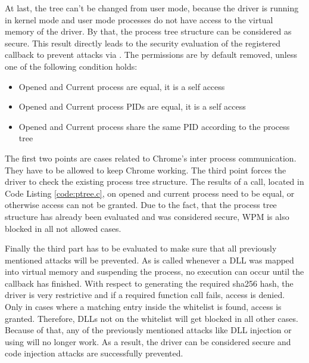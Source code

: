 At last, the tree can't be changed from user mode, because the driver is running in kernel mode and user mode processes do not have access to the virtual memory of the driver. By that, the process tree structure can be considered as secure. This result directly leads to the security evaluation of the registered callback to prevent attacks via . The permissions are by default removed, unless one of the following condition holds:
\begin{itemize}
\item Opened and Current process are equal, it is a self access
\item Opened and Current process \glspl{PID} are equal, it is a self access
\item Opened and Current process share the same \gls{PID} according to the process tree
\end{itemize}
The first two points are cases related to Chrome's inter process communication. They have to be allowed to keep Chrome working. The third point forces the driver to check the existing process tree structure. The results of a  call, located in Code Listing \ref{code:ptree.c}, on opened and current process need to be equal, or otherwise access can not be granted. Due to the fact, that the process tree structure has already been evaluated and was considered secure, \gls{WPM} is also blocked in all not allowed cases. 

Finally the third part has to be evaluated to make sure that all previously mentioned attacks will be prevented. As  is called whenever a \gls{DLL} was mapped into virtual memory and suspending the process, no execution can occur until the callback has finished. With respect to generating the required sha256 hash, the driver is very restrictive and if a required function call fails, access is denied. Only in cases where a matching entry inside the whitelist is found, access is granted. Therefore, \glspl{DLL} not on the whitelist will get blocked in all other cases. Because of that, any of the previously mentioned attacks like \gls{DLL} injection or using  will no longer work. As a result, the driver can be considered secure and code injection attacks are successfully prevented.